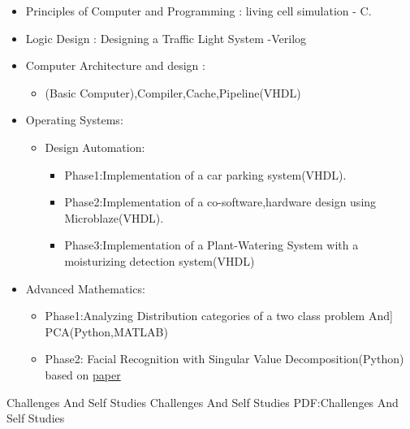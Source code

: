\documentclass[letterpaper,MMMyyyy,nonstopmode]{simpleresumecv}
\begin{document}
\begin{Body}
\begin{itemize}
	\item Principles of Computer and Programming : 
	      living cell simulation - C.
   	\item Logic Design : 
   	Designing a Traffic Light System -Verilog
   	\item Computer Architecture and design :
   		\begin{itemize}
		\item (Basic Computer),Compiler,Cache,Pipeline(VHDL)
		\end{itemize}
		
     \item Operating Systems:
     \begin{itemize}
       \itemMultiprocessing,Multithreading in Windows and Linux(C)
	
	

	
	\item Design Automation:
		\begin{itemize}
		\item Phase1:Implementation of a car parking system(VHDL).
     	\item Phase2:Implementation of a co-software,hardware design using
     	      Microblaze(VHDL).
	    \item Phase3:Implementation of a Plant-Watering System with a moisturizing
	          detection system(VHDL)
	          
		\end{itemize}
			\end{itemize}
	
		
    \item Advanced Mathematics: 
	    \begin{itemize}
        \item Phase1:Analyzing Distribution categories of a two class  problem And] PCA(Python,MATLAB)
		      \item Phase2:
     	     Facial Recognition with Singular Value Decomposition(Python)
     	     based on 	\href{https://link.springer.com/chapter/10.1007/978-1-4020-6264-3_26}{paper}
     \end{itemize}
      \end{itemize}	
   
       	



\Section
{Challenges And Self Studies}
{Challenges And Self Studies}
{PDF:Challenges And Self Studies}

\Entry
\begin{itemize}


\end{itemize}
\end{Body}
\end{document}
